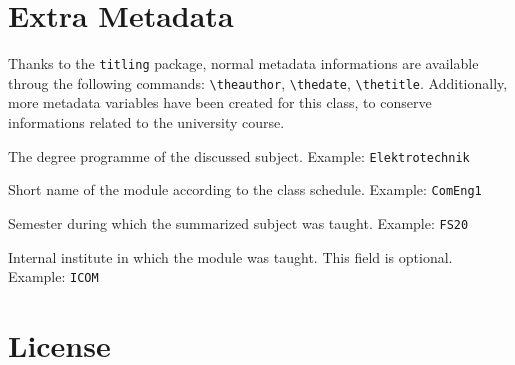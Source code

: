 \documentclass[concrete, header, margin=huge]{hsrzf}
\newcommand{\vb}[1]{\texttt{#1}}
\newcommand{\cs}[1]{\texttt{\textbackslash #1}}
\begin{document}
\section{Extra Metadata}
Thanks to the {\tt titling} package, normal metadata informations are available throug the following commands: \cs{theauthor}, \cs{thedate}, \cs{thetitle}. Additionally, more metadata variables have been created for this class, to conserve informations related to the university course.
\begin{description}[align=right]
\item[\cs{course}] The degree programme of the discussed subject. Example: \vb{Elektrotechnik}
\item[\cs{module}] Short name of the module according to the class schedule. Example: \vb{ComEng1}
\item[\cs{semester}] Semester during which the summarized subject was taught. Example: \vb{FS20}
\item[\cs{institute}] Internal institute in which the module was taught. This field is optional. Example: \vb{ICOM}
\end{description}


\section{License}
\doclicenseThis
\end{document}
